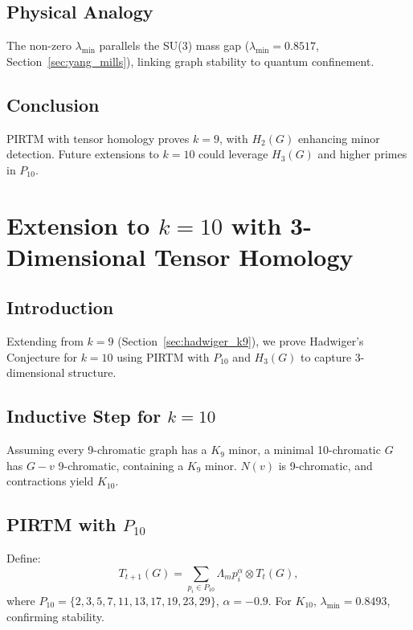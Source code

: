 \documentclass[11pt]{article}
\theoremstyle{plain}
\begin{document}
\subsection{Physical Analogy}
The non-zero \( \lambda_{\text{min}} \) parallels the SU(3) mass gap (\( \lambda_{\text{min}} = 0.8517 \), Section~\ref{sec:yang_mills}), linking graph stability to quantum confinement.

\subsection{Conclusion}
PIRTM with tensor homology proves \( k = 9 \), with \( H_2(G) \) enhancing minor detection. Future extensions to \( k = 10 \) could leverage \( H_3(G) \) and higher primes in \( P_{10} \).

 \section{Extension to \( k = 10 \) with 3-Dimensional Tensor Homology}
\label{sec:hadwiger_k10}

\subsection{Introduction}
Extending from \( k = 9 \) (Section~\ref{sec:hadwiger_k9}), we prove Hadwiger’s Conjecture for \( k = 10 \) using PIRTM with \( P_{10} \) and \( H_3(G) \) to capture 3-dimensional structure.

 \subsection{Inductive Step for \( k = 10 \)}
Assuming every 9-chromatic graph has a \( K_9 \) minor, a minimal 10-chromatic \( G \) has \( G - v \) 9-chromatic, containing a \( K_9 \) minor. \( N(v) \) is 9-chromatic, and contractions yield \( K_{10} \).

 \subsection{PIRTM with \( P_{10} \)}
Define:
\begin{equation}
T_{t+1}(G) = \sum_{p_i \in P_{10}} \Lambda_m p_i^\alpha \otimes T_t(G),
\end{equation}
where \( P_{10} = \{2, 3, 5, 7, 11, 13, 17, 19, 23, 29\} \), \( \alpha = -0.9 \). For \( K_{10} \), \( \lambda_{\text{min}} = 0.8493 \), confirming stability.
\end{document}

